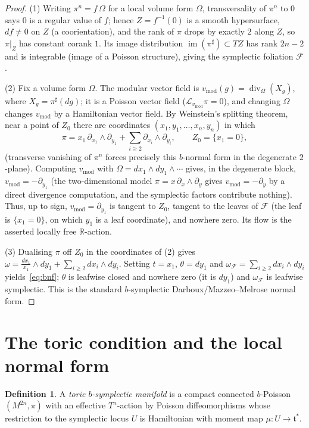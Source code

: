 \documentclass{amsart}
\theoremstyle{definition}
\newtheorem{definition}{Definition}
\begin{document}
\begin{proof}
(1) Writing $\pi^n=f\,\Omega$ for a local volume form $\Omega$, transversality
of $\pi^n$ to $0$ says $0$ is a regular value of $f$; hence $Z=f^{-1}(0)$ is a
smooth hypersurface, $df\neq0$ on $Z$ (a coorientation), and the rank of $\pi$
drops by exactly $2$ along $Z$, so $\pi|_Z$ has constant corank $1$. Its image
distribution $\operatorname{im}(\pi^\sharp)\subset TZ$ has rank $2n-2$ and is
integrable (image of a Poisson structure), giving the symplectic foliation
$\mathcal F$.

(2) Fix a volume form $\Omega$. The modular vector field is
$v_{\mathrm{mod}}(g)=\operatorname{div}_\Omega(X_g)$, where
$X_g=\pi^\sharp(dg)$; it is a Poisson vector field
($\mathcal L_{v_{\mathrm{mod}}}\pi=0$), and changing $\Omega$ changes
$v_{\mathrm{mod}}$ by a Hamiltonian vector field. By Weinstein's splitting
theorem, near a point of $Z_0$ there are coordinates $(x_1,y_1,\dots,x_n,y_n)$
in which
\[
\pi=x_1\,\partial_{x_1}\wedge\partial_{y_1}
+\sum_{i\ge2}\partial_{x_i}\wedge\partial_{y_i},\qquad Z_0=\{x_1=0\},
\]
(transverse vanishing of $\pi^n$ forces precisely this $b$-normal form in the
degenerate $2$-plane). Computing $v_{\mathrm{mod}}$ with
$\Omega=dx_1\wedge dy_1\wedge\cdots$ gives, in the degenerate block,
$v_{\mathrm{mod}}=-\partial_{y_1}$ (the two-dimensional model
$\pi=x\,\partial_x\wedge\partial_y$ gives $v_{\mathrm{mod}}=-\partial_y$ by a
direct divergence computation, and the symplectic factors contribute nothing).
Thus, up to sign, $v_{\mathrm{mod}}=\partial_{y_1}$ is tangent to $Z_0$,
tangent to the leaves of $\mathcal F$ (the leaf is $\{x_1=0\}$, on which
$y_1$ is a leaf coordinate), and nowhere zero. Its flow is the asserted locally
free $\mathbb R$-action.

(3) Dualising $\pi$ off $Z_0$ in the coordinates of (2) gives
$\omega=\tfrac{dx_1}{x_1}\wedge dy_1+\sum_{i\ge2}dx_i\wedge dy_i$. Setting
$t=x_1$, $\theta=dy_1$ and $\omega_{\mathcal F}=\sum_{i\ge2}dx_i\wedge dy_i$
yields~\eqref{eq:bnf}; $\theta$ is leafwise closed and nowhere zero (it is
$dy_1$) and $\omega_{\mathcal F}$ is leafwise symplectic. This is the standard
$b$-symplectic Darboux/Mazzeo--Melrose normal form.
\end{proof}

\section{The toric condition and the local normal form}

\begin{definition}\label{def:toricb}
A \emph{toric $b$-symplectic manifold} is a compact connected $b$-Poisson
$(M^{2n},\pi)$ with an effective $T^n$-action by Poisson diffeomorphisms whose
restriction to the symplectic locus $U$ is Hamiltonian with moment map
$\mu\colon U\to\mathfrak t^*$.
\end{definition}
\end{document}
